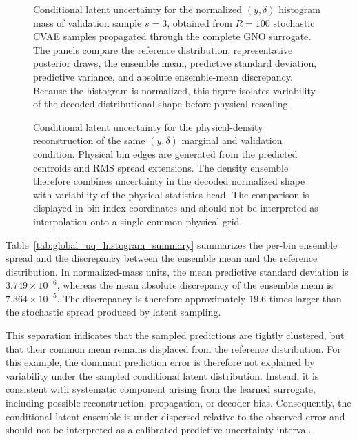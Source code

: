 \begin{figure}[h!]
\centering
{}
\caption{
Conditional latent uncertainty for the normalized \((y,\delta)\) histogram mass of validation sample \(s=3\), obtained from \(R=100\) stochastic CVAE samples propagated through the complete GNO surrogate. The panels compare the reference distribution, representative posterior draws, the ensemble mean, predictive standard deviation, predictive variance, and absolute ensemble-mean discrepancy. Because the histogram is normalized, this figure isolates variability of the decoded distributional shape before physical rescaling.
}
\label{fig:global_uq_mass_ensemble}
\end{figure}

\begin{figure}[h!]
\centering
{}
\caption{
Conditional latent uncertainty for the physical-density reconstruction of the same \((y,\delta)\) marginal and validation condition. Physical bin edges are generated from the predicted centroids and RMS spread extensions. The density ensemble therefore combines uncertainty in the decoded normalized shape with variability of the physical-statistics head. The comparison is displayed in bin-index coordinates and should not be interpreted as interpolation onto a single common physical grid.
}
\label{fig:global_uq_density_ensemble}
\end{figure}

Table~\ref{tab:global_uq_histogram_summary} summarizes the per-bin ensemble spread and the discrepancy between the ensemble mean and the reference distribution. In normalized-mass units, the mean predictive standard deviation is \(3.749\times10^{-6}\), whereas the mean absolute discrepancy of the ensemble mean is \(7.364\times10^{-5}\). The discrepancy is therefore approximately \(19.6\) times larger than the stochastic spread produced by latent sampling.

This separation indicates that the sampled predictions are tightly clustered, but that their common mean remains displaced from the reference distribution. For this example, the dominant prediction error is therefore not explained by variability under the sampled conditional latent distribution. Instead, it is consistent with  systematic component arising from the learned surrogate, including possible reconstruction, propagation, or decoder bias. Consequently, the conditional latent ensemble is under-dispersed relative to the observed error and should not be interpreted as a calibrated predictive
uncertainty interval.

